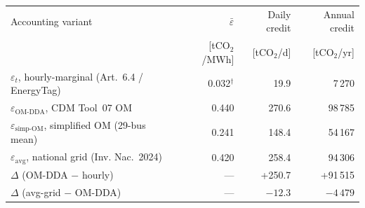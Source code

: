 \setlength{\tabcolsep}{4pt}
\renewcommand{\arraystretch}{1.10}
\begin{tabular}{@{}lrrr@{}}
\toprule
Accounting variant
  & $\bar\varepsilon$
  & Daily credit
  & Annual credit \\
  & [tCO$_2$/MWh]
  & [tCO$_2$/d]
  & [tCO$_2$/yr] \\
\midrule
$\varepsilon_t$, hourly-marginal (Art.~6.4 / EnergyTag) & 0.032$^{\dagger}$ & 19.9 & 7\,270 \\
$\varepsilon_{\mathrm{OM\text{-}DDA}}$, CDM Tool~07 OM       & 0.440 & 270.6 & 98\,785 \\
$\varepsilon_{\mathrm{simp\text{-}OM}}$, simplified OM (29-bus mean) & 0.241 & 148.4 & 54\,167 \\
$\varepsilon_{\mathrm{avg}}$, national grid (Inv. Nac.\ 2024) & 0.420 & 258.4 & 94\,306 \\
\midrule
$\Delta$ (OM-DDA $-$ hourly)        & --- &  +250.7 & +91\,515 \\
$\Delta$ (avg-grid $-$ OM-DDA)      & --- &  $-12.3$  & $-4\,479$  \\
\bottomrule
\end{tabular}

